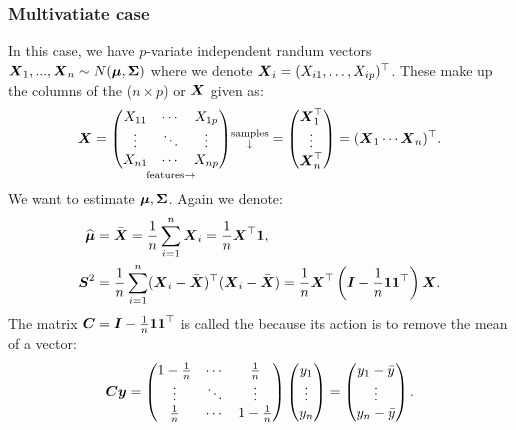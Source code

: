 \subsubsection{Multivatiate case}
In this case, we have $p$-variate independent randum vectors $\boldsymbol{X}_1,...,\boldsymbol{X}_n \sim N(\boldsymbol{\mu}, \boldsymbol{\Sigma})$ where we denote $\boldsymbol{X}_i=(X_{i1},\dots,X_{ip})^\top$. These make up the columns of the ($n\times p$)  or  $\boldsymbol{X}$ given as:
$$
    \boldsymbol{X} = 
    \underset{\mathrm{features} \rightarrow}{
    \begin{pmatrix}
        X_{11} & \cdots & X_{1p} \\
        \vdots & \ddots & \vdots \\
        X_{n1} & \cdots & X_{np}
    \end{pmatrix}}
    \substack{\text{samples} \\ \downarrow}
    = \begin{pmatrix}
        \boldsymbol{X}_1^\top \\ \vdots \\ \boldsymbol{X}_n^\top
    \end{pmatrix}= (\boldsymbol{X}_1 \cdots \boldsymbol{X}_n)^\top.
$$
We want to estimate $\boldsymbol{\mu}, \boldsymbol{\Sigma}$. Again we denote:
\begin{align*}
    \widehat{\boldsymbol{\mu}} &= \bar{\boldsymbol{X}} = \frac{1}{n} \sum_{i=1}^n \boldsymbol{X}_i = \frac{1}{n}\boldsymbol{X}^\top \boldsymbol{1}, \\
    \boldsymbol{S}^2 
    &= \frac{1}{n} \sum_{i=1}^n (\boldsymbol{X}_i-\bar{\boldsymbol{X}})^\top(\boldsymbol{X}_i-\bar{\boldsymbol{X}}) 
    = \frac{1}{n} \boldsymbol{X}^\top\left( \boldsymbol{I}-\frac{1}{n} \boldsymbol{1}\boldsymbol{1}^\top \right)\boldsymbol{X}.
\end{align*}
The matrix $\boldsymbol{C}=\boldsymbol{I}-\frac{1}{n} \boldsymbol{1}\boldsymbol{1}^\top$ is called the  because its action is to remove the mean of a vector:
$$
    \boldsymbol{C} \boldsymbol{y} = \begin{pmatrix}
        1-\frac{1}{n} & \cdots & \frac{1}{n} \\
        \vdots & \ddots & \vdots \\
        \frac{1}{n} & \cdots & 1-\frac{1}{n}
    \end{pmatrix}
    \begin{pmatrix}
        y_1 \\ \vdots \\ y_n
    \end{pmatrix}
    = 
    \begin{pmatrix}
        y_1-\bar{y} \\ \vdots \\ y_n-\bar{y}
    \end{pmatrix}.
$$

